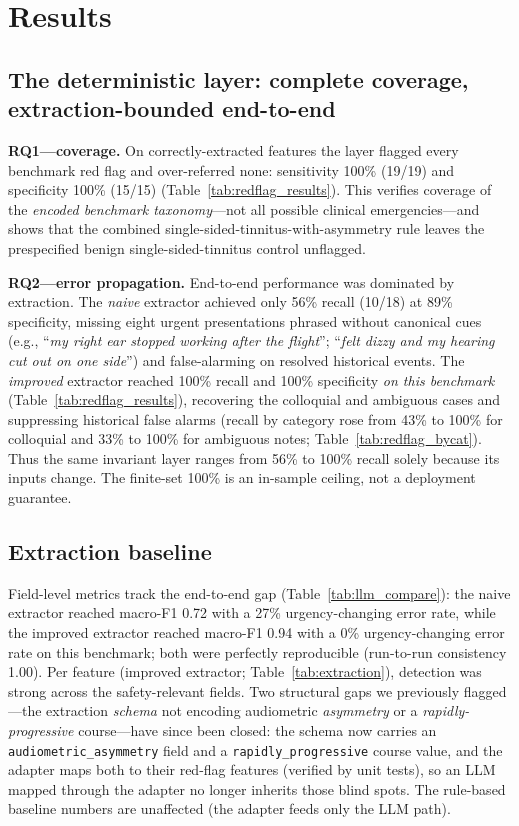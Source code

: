 \documentclass[11pt]{article}
\begin{document}
\section{Results}
\subsection{The deterministic layer: complete coverage, extraction-bounded end-to-end}
\textbf{RQ1---coverage.} On correctly-extracted features the layer flagged every benchmark red flag and over-referred none: sensitivity 100\% (19/19) and specificity 100\% (15/15) (Table~\ref{tab:redflag_results}). This verifies coverage of the \emph{encoded benchmark taxonomy}---not all possible clinical emergencies---and shows that the combined single-sided-tinnitus-with-asymmetry rule leaves the prespecified benign single-sided-tinnitus control unflagged.

\textbf{RQ2---error propagation.} End-to-end performance was dominated by extraction. The \emph{naive} extractor achieved only 56\% recall (10/18) at 89\% specificity, missing eight urgent presentations phrased without canonical cues (e.g., ``\emph{my right ear stopped working after the flight}''; ``\emph{felt dizzy and my hearing cut out on one side}'') and false-alarming on resolved historical events. The \emph{improved} extractor reached 100\% recall and 100\% specificity \emph{on this benchmark} (Table~\ref{tab:redflag_results}), recovering the colloquial and ambiguous cases and suppressing historical false alarms (recall by category rose from 43\% to 100\% for colloquial and 33\% to 100\% for ambiguous notes; Table~\ref{tab:redflag_bycat}). Thus the same invariant layer ranges from 56\% to 100\% recall solely because its inputs change. The finite-set 100\% is an in-sample ceiling, not a deployment guarantee.




\subsection{Extraction baseline}
Field-level metrics track the end-to-end gap (Table~\ref{tab:llm_compare}): the naive extractor reached macro-F1 0.72 with a 27\% urgency-changing error rate, while the improved extractor reached macro-F1 0.94 with a 0\% urgency-changing error rate on this benchmark; both were perfectly reproducible (run-to-run consistency 1.00). Per feature (improved extractor; Table~\ref{tab:extraction}), detection was strong across the safety-relevant fields. Two structural gaps we previously flagged---the extraction \emph{schema} not encoding audiometric \emph{asymmetry} or a \emph{rapidly-progressive} course---have since been closed: the schema now carries an \texttt{audiometric\_asymmetry} field and a \texttt{rapidly\_progressive} course value, and the adapter maps both to their red-flag features (verified by unit tests), so an LLM mapped through the adapter no longer inherits those blind spots. The rule-based baseline numbers are unaffected (the adapter feeds only the LLM path).
\end{document}
